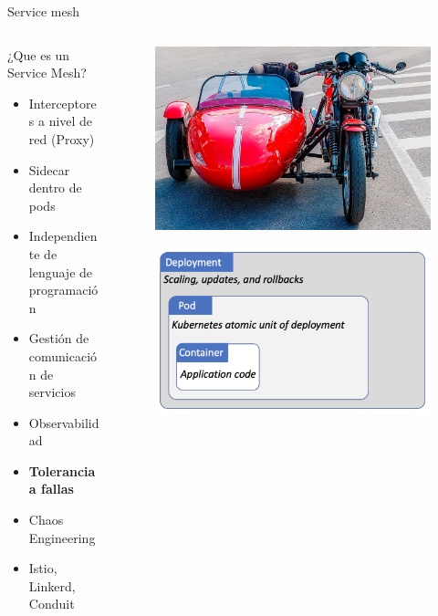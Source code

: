 \documentclass[aspectratio=169]{beamer}
\begin{document}
\begin{frame}{Service mesh}


\begin{columns}[T] %
\begin{column}[T]{7cm} %
\begin{alertblock}{¿Que es un Service Mesh?}
        \begin{itemize}
            \item Interceptores a nivel de red (Proxy)
            \item Sidecar dentro de pods
            \item Independiente de lenguaje de programación
            \item Gestión de comunicación de servicios
            \item Observabilidad
            \item \textbf{Tolerancia a fallas}
           \item Chaos Engineering
            \item Istio, Linkerd, Conduit
        \end{itemize}
    \end{alertblock}
\end{column}
\begin{column}[T]{5cm} %
	\begin{figure}
		\centering
		\includegraphics[width=0.9\linewidth]{Images/sidecar}
	\end{figure}
    \begin{figure}
    		\centering
    		\includegraphics[width=\linewidth]{Images/pod}

\end{figure}
\end{column}
\end{columns}
\end{frame}
\end{document}
